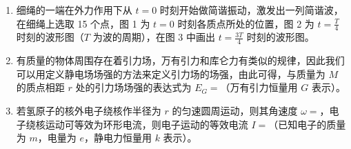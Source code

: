\documentclass[\gkver]{gaokaozhenti}
\begin{document}
\begin{enumerate}
\onepicture[align=right, w=4.67cm]{}


\item
细绳的一端在外力作用下从 $t=0$ 时刻开始做简谐振动，激发出一列简谐波，在细绳上选取 15 个点，图 1 为 $t=0$ 时刻各质点所处的位置，图 2 为 $t=\frac{T}{4}$ 时刻的波形图（$T$ 为波的周期），在图 3 中画出 $t=\frac{3T}{4}$ 时刻的波形图。

\onepicture[w=13.00cm]{}


\item
有质量的物体周围存在着引力场，万有引力和库仑力有类似的规律，因此我们可以用定义静电场场强的方法来定义引力场的场强，由此可得，与质量为 $M$ 的质点相距 $r$ 处的引力场场强的表达式为 $E_{G}=$（万有引力恒量用 $G$ 表示）。


\item
若氢原子的核外电子绕核作半径为 $r$ 的匀速圆周运动，则其角速度 $\omega=$，电子绕核运动可等效为环形电流，则电子运动的等效电流 $I=$（已知电子的质量为 $m$，电量为 $e$，静电力恒量用 $k$ 表示）。



\end{enumerate}
\end{document}
